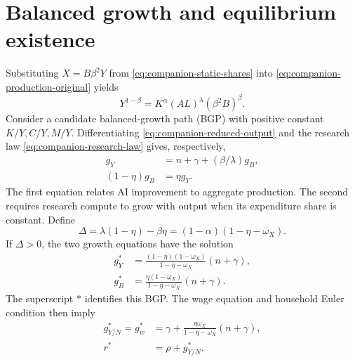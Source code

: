 \section{Balanced growth and equilibrium existence}
\label{sec:companion-bgp}

Substituting $X=B\beta^2Y$ from \eqref{eq:companion-static-shares} into
\eqref{eq:companion-production-original} yields
\begin{equation}
 Y^{1-\beta}=K^\alpha(AL)^\lambda(\beta^2B)^\beta.
 \label{eq:companion-reduced-output}
\end{equation}
Consider a candidate balanced-growth path (BGP) with positive constant
$K/Y,C/Y,M/Y$. Differentiating \eqref{eq:companion-reduced-output} and the
research law \eqref{eq:companion-research-law} gives, respectively,
\begin{align}
 g_Y&=n+\gamma+(\beta/\lambda)g_B,\label{eq:companion-production-growth}\\
 (1-\eta)g_B&=\eta g_Y.\label{eq:companion-research-growth}
\end{align}
The first equation relates AI improvement to aggregate production. The second
requires research compute to grow with output when its expenditure share is
constant. Define
\begin{equation}
 \Delta=\lambda(1-\eta)-\beta\eta=(1-\alpha)(1-\eta-\omega_X).
 \label{eq:companion-feedback}
\end{equation}
If $\Delta>0$, the two growth equations have the solution
\begin{align}
 g_Y^*&=\frac{(1-\eta)(1-\omega_X)}{1-\eta-\omega_X}(n+\gamma),
 \label{eq:companion-gy}\\
 g_B^*&=\frac{\eta(1-\omega_X)}{1-\eta-\omega_X}(n+\gamma).
 \label{eq:companion-gb}
\end{align}
The superscript $*$ identifies this BGP. The wage equation and household Euler
condition then imply
\begin{align}
 g_{Y/N}^*=g_w^*&=\gamma+
 \frac{\eta\omega_X}{1-\eta-\omega_X}(n+\gamma),
 \label{eq:companion-premium}\\
 r^*&=\rho+g_{Y/N}^*.\label{eq:companion-bgp-return}
\end{align}

